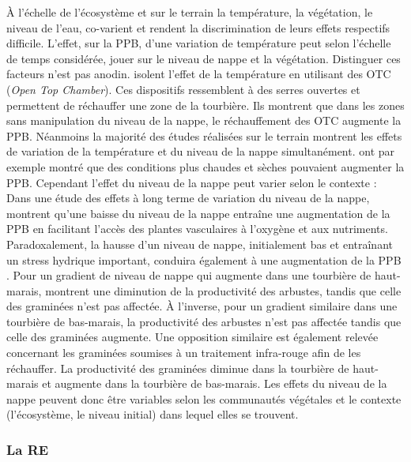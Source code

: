 À l'échelle de l'écosystème et sur le terrain la température, la végétation, le niveau de l'eau, co-varient et rendent la discrimination de leurs effets respectifs difficile.
L'effet, sur la PPB, d'une variation de température peut selon l'échelle de temps considérée, jouer sur le niveau de nappe et la végétation.
Distinguer ces facteurs n'est pas anodin.
\citet{munir2015} isolent l'effet de la température en utilisant des OTC (\textit{Open Top Chamber}).
Ces dispositifs ressemblent à des serres ouvertes et permettent de réchauffer une zone de la tourbière.
Ils montrent que dans les zones sans manipulation du niveau de la nappe, le réchauffement des OTC augmente la PPB.
Néanmoins la majorité des études réalisées sur le terrain montrent les effets de variation de la température et du niveau de la nappe simultanément.
\citet{cai2010} ont par exemple montré que des conditions plus chaudes et sèches pouvaient augmenter la PPB.
Cependant l'effet du niveau de la nappe peut varier selon le contexte : Dans une étude des effets à long terme de variation du niveau de la nappe, \citet{ballantyne2014} montrent qu'une baisse du niveau de la nappe entraîne une augmentation de la PPB en facilitant l'accès des plantes vasculaires à l'oxygène et aux nutriments.
Paradoxalement, la hausse d'un niveau de nappe, initialement bas et entraînant un stress hydrique important, conduira également à une augmentation de la PPB \citep{strack2013}.
Pour un gradient de niveau de nappe qui augmente dans une tourbière de haut-marais, \citet{weltzin2000} montrent une diminution de la productivité des arbustes, tandis que celle des graminées n'est pas affectée.
À l'inverse, pour un gradient similaire dans une tourbière de bas-marais, la productivité des arbustes n'est pas affectée tandis que celle des graminées augmente.
Une opposition similaire est également relevée concernant les graminées soumises à un traitement infra-rouge afin de les réchauffer.
La productivité des graminées diminue dans la tourbière de haut-marais et augmente dans la tourbière de bas-marais.
Les effets du niveau de la nappe peuvent donc être variables selon les communautés végétales et le contexte (l'écosystème, le niveau initial) dans lequel elles se trouvent.

\subsubsection{La RE}

